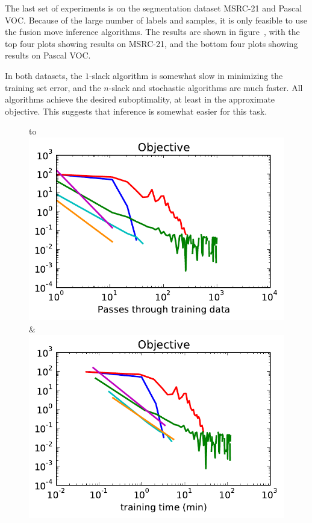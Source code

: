 The last set of experiments is on the segmentation dataset MSRC-21 and Pascal
VOC\@.  Because of the large number of labels and samples, it is only feasible
to use the fusion move inference algorithms. The results are shown in
figure~\cite{msrc_pascal_curves}, with the top four plots showing results on
MSRC-21, and the bottom four plots showing results on Pascal VOC.

In both datasets, the $1$-slack algorithm is somewhat slow in minimizing the
training set error, and the $n$-slack and stochastic algorithms are much
faster. All algorithms achieve the desired suboptimality, at least in the
approximate objective. This suggests that inference is somewhat easier for this
task.

\begin{figure}
    \begin{tabu} to 
    \\[-3mm]
    \includegraphics[width=\linewidth]{evaluation/images/msrc}&%
    \includegraphics[width=\linewidth]{evaluation/images/msrc_time}\\

\end{tabu}
\end{figure}
